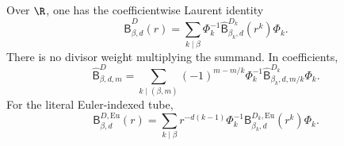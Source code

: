 \begin{theorem}
\label{rdt:thm:MC}
Over $\R$, one has the coefficientwise Laurent identity
\begin{equation}\label{rdt:eq:MC}
 \boxed{\displaystyle
 \widehat{\mathsf B}^D_{\beta,d}(r)=\sum_{k\mid\beta}
     \Phi_k^{-1}\widehat{\mathsf B}^{D_k}_{\beta_k,d}(r^k)\Phi_k.}
\end{equation}
There is no divisor weight multiplying the summand. In coefficients,
\begin{equation}\label{rdt:eq:MCcoeff}
 \widehat{\mathsf B}^D_{\beta,d,m}=\sum_{k\mid(\beta,m)}
     (-1)^{m-m/k}\Phi_k^{-1}
       \widehat{\mathsf B}^{D_k}_{\beta_k,d,m/k}\Phi_k.
\end{equation}
For the literal Euler-indexed tube,
\begin{equation}\label{rdt:eq:MCEu}
 \mathsf B^{D,\mathrm{Eu}}_{\beta,d}(r)
  =\sum_{k\mid\beta}r^{-d(k-1)}
       \Phi_k^{-1}\mathsf B^{D_k,\mathrm{Eu}}_{\beta_k,d}(r^k)\Phi_k.
\end{equation}
\end{theorem}
